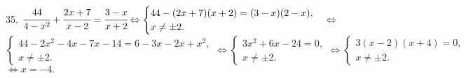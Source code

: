 35. $\cfrac{44}{4-x^2}+\cfrac{2x+7}{x-2}=\cfrac{3-x}{x+2}\Leftrightarrow \begin{cases}44-(2x+7)(x+2)=(3-x)(2-x),\\ x\neq\pm2.\end{cases}
\Leftrightarrow$\\$ \begin{cases}44-2x^2-4x-7x-14=6-3x-2x+x^2,\\ x\neq\pm2.\end{cases}
\Leftrightarrow \begin{cases}3x^2+6x-24=0,\\ x\neq\pm2.\end{cases}
\Leftrightarrow \begin{cases}3(x-2)(x+4)=0,\\ x\neq\pm2.\end{cases}$\\$\Leftrightarrow x=-4.$\\
